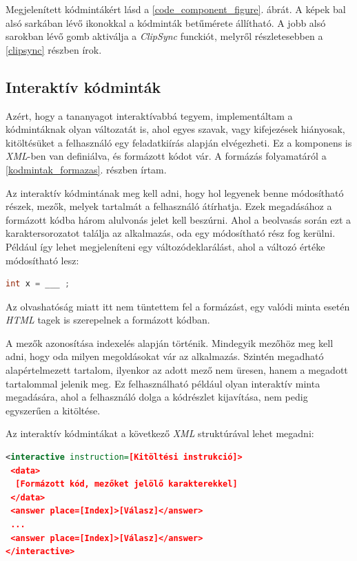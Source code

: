 \documentclass[12pt,a4paper]{article}
\newcommand{\xml}{\textit{XML}\xspace}
\begin{document}
	Megjelenített kódmintákért lásd a \ref{code_component_figure}. ábrát. A képek bal alsó sarkában lévő ikonokkal a kódminták betűmérete állítható. A jobb alsó sarokban lévő gomb aktiválja a \textit{ClipSync} funckiót, melyről részletesebben a \ref{clipsync} részben írok.
	
	\subsection{Interaktív kódminták}
	
	Azért, hogy a tananyagot interaktívabbá tegyem, implementáltam a kódmintáknak olyan változatát is, ahol egyes szavak, vagy kifejezések hiányosak, kitöltésüket a felhasználó egy feladatkiírás alapján elvégezheti. Ez a komponens is \xml-ben van definiálva, és formázott kódot vár. A formázás folyamatáról a \ref{kodmintak_formazas}. részben írtam.
	
	Az interaktív kódmintának meg kell adni, hogy hol legyenek benne módosítható részek, mezők, melyek tartalmát a felhasználó átírhatja. Ezek megadásához a formázott kódba három alulvonás jelet kell beszúrni. Ahol a beolvasás során ezt a karaktersorozatot találja az alkalmazás, oda egy módosítható rész fog kerülni. Például így lehet megjeleníteni egy változódeklarálást, ahol a változó értéke módosítható lesz:
	
	\bigskip
	\begin{lstlisting}[language=Java]
int x = ___ ;
	\end{lstlisting}  
	\bigskip
	
	Az olvashatóság miatt itt nem tüntettem fel a formázást, egy valódi minta esetén \textit{HTML} tagek is szerepelnek a formázott kódban.
	
	A mezők azonosítása indexelés alapján történik. Mindegyik mezőhöz meg kell adni, hogy oda milyen megoldásokat vár az alkalmazás. Szintén megadható alapértelmezett tartalom, ilyenkor az adott mező nem üresen, hanem a megadott tartalommal jelenik meg. Ez felhasználható például olyan interaktív minta megadására, ahol a felhasználó dolga a kódrészlet kijavítása, nem pedig egyszerűen a kitöltése.
	
	Az interaktív kódmintákat a következő \xml struktúrával lehet megadni:
	
	\bigskip
	\begin{lstlisting}[language=XML]
<interactive instruction=[Kitöltési instrukció]>
 <data>
  [Formázott kód, mezőket jelölő karakterekkel]
 </data>
 <answer place=[Index]>[Válasz]</answer>
 ...
 <answer place=[Index]>[Válasz]</answer>
</interactive>
	\end{lstlisting}
	\bigskip
	
\end{document}
